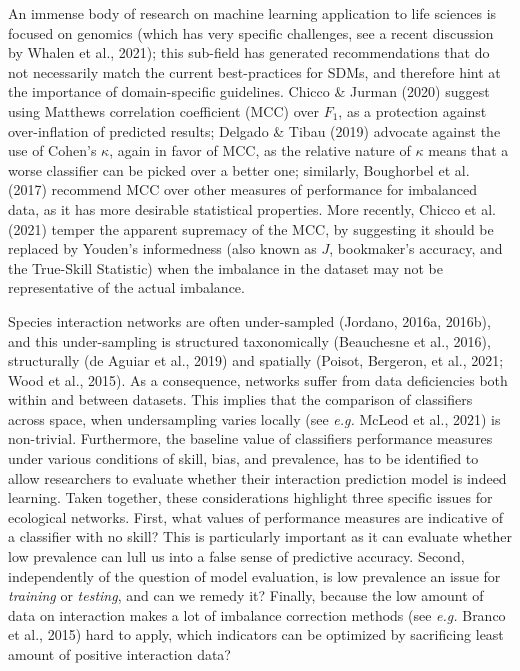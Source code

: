 \documentclass[11pt]{article}
\begin{document}
An immense body of research on machine learning application to life
sciences is focused on genomics (which has very specific challenges, see
a recent discussion by Whalen et al., 2021); this sub-field has
generated recommendations that do not necessarily match the current
best-practices for SDMs, and therefore hint at the importance of
domain-specific guidelines. Chicco \& Jurman (2020) suggest using
Matthews correlation coefficient (MCC) over \(F_1\), as a protection
against over-inflation of predicted results; Delgado \& Tibau (2019)
advocate against the use of Cohen's \(\kappa\), again in favor of MCC,
as the relative nature of \(\kappa\) means that a worse classifier can
be picked over a better one; similarly, Boughorbel et al. (2017)
recommend MCC over other measures of performance for imbalanced data, as
it has more desirable statistical properties. More recently, Chicco et
al. (2021) temper the apparent supremacy of the MCC, by suggesting it
should be replaced by Youden's informedness (also known as \(J\),
bookmaker's accuracy, and the True-Skill Statistic) when the imbalance
in the dataset may not be representative of the actual imbalance.

Species interaction networks are often under-sampled (Jordano, 2016a,
2016b), and this under-sampling is structured taxonomically (Beauchesne
et al., 2016), structurally (de Aguiar et al., 2019) and spatially
(Poisot, Bergeron, et al., 2021; Wood et al., 2015). As a consequence,
networks suffer from data deficiencies both within and between datasets.
This implies that the comparison of classifiers across space, when
undersampling varies locally (see \emph{e.g.} McLeod et al., 2021) is
non-trivial. Furthermore, the baseline value of classifiers performance
measures under various conditions of skill, bias, and prevalence, has to
be identified to allow researchers to evaluate whether their interaction
prediction model is indeed learning. Taken together, these
considerations highlight three specific issues for ecological networks.
First, what values of performance measures are indicative of a
classifier with no skill? This is particularly important as it can
evaluate whether low prevalence can lull us into a false sense of
predictive accuracy. Second, independently of the question of model
evaluation, is low prevalence an issue for \emph{training} or
\emph{testing}, and can we remedy it? Finally, because the low amount of
data on interaction makes a lot of imbalance correction methods (see
\emph{e.g.} Branco et al., 2015) hard to apply, which indicators can be
optimized by sacrificing least amount of positive interaction data?
\end{document}
